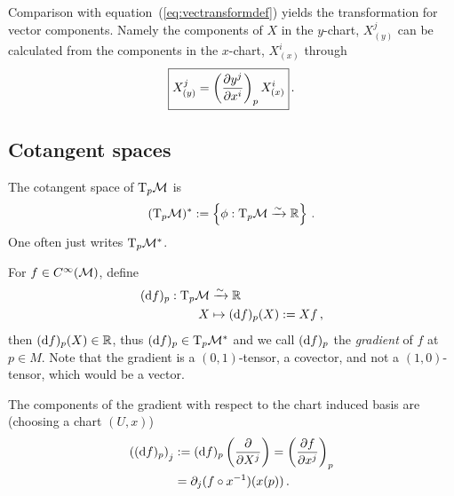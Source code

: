 \documentclass[11pt, a4paper, twocolumn]{article} %
\begin{document}
Comparison with equation~(\ref{eq:vectransformdef}) yields the transformation for vector components.
Namely the components of $X$ in the $y$-chart, $X^{j}_{(y)}$ can be calculated from the components
in the $x$-chart, $X^i_{(x)}$ through
\begin{equation}
    \boxed{%
    X^j_{(y)} = \left( \frac{\partial y^j}{\partial x^i} \right)_p X^{i}_{(x)}
}\,.
\end{equation}

\subsection{Cotangent spaces}
The cotangent space of $\T_p\M$ is
\begin{equation}
    (\T_p\M)^* := \left\{ \phi: \T_p\M \linearto \mathbb{R} \right\}\,.
\end{equation}
One often just writes $\T_p\M^*$.
\begin{exmp}[Gradient]
    For $f\in C^\infty(\mathcal{M})$, define 
    \begin{align}
        (\diff f)_p: \T_p\M &\linearto \mathbb{R}\nonumber\\
        X &\mapsto (\diff f)_p(X) := Xf\,,
        \label{eq:differential}
    \end{align}
    then $(\operatorname{d\!} f)_p(X) \in \mathbb{R}$, thus
    $(\diff f)_p \in \T_p\M^*$ and we call $(\operatorname{d\!} f)_p$ the \textit{gradient} of $f$ at $p\in M$. 
    Note that the gradient is a $(0,1)$-tensor, a covector, and not a $(1,0)$-tensor,
    which would be a vector.

    The components of the gradient with respect to the chart induced basis are
    (choosing a chart $(U, x)$)
    \begin{align}
        \nonumber \left( (\operatorname{d\!} f)_p \right)_j &:= (\operatorname{d\!} f)_p\left( \frac{\partial}{\partial X^j} \right)
        = \left( \frac{\partial f}{\partial x^j} \right)_p\\
        &= \partial_j (f\circ x^{-1})(x(p))\,.
    \end{align}
\end{exmp}
\end{document}
